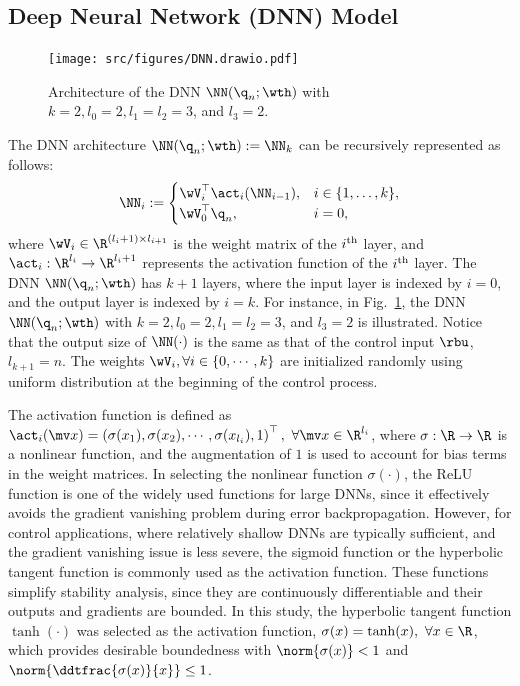 \documentclass[journal]{IEEEtran}
\begin{document}
\subsection{Deep Neural Network (DNN) Model}\label{sec:sub:NN definition}

\begin{figure}[t]
    \centering
    \texttt{[image: src/figures/DNN.drawio.pdf]}
    \caption{
        Architecture of the DNN $\NN({\q}_n;\wth)$ with $k=2,l_0=2,l_1=l_2=3$, and $l_3=2$.
    }
    \label{fig:DNN}
\end{figure}

The DNN architecture $\NN({\q}_n;\wth) := \NN_k$ can be recursively represented as follows:
\begin{equation}
    \NN_i :=
    \begin{cases}
        \wV_i^\top \act_i(\NN_{i-1}), 
        &
        i\in\{1,\dots ,k\},
        \\
        \wV_0^\top {\q}_n,
        &
        i=0
        ,
    \end{cases}
    \label{eq:DNN:architecture}
\end{equation}
where $\wV_i\in\R^{(l_i+1)\times l_{i+1}}$ is the weight matrix of the $i\textsuperscript{th}$ layer, and $\act_i: \R^{l_i}\to\R^{l_i+1}$ represents the activation function of the $i\textsuperscript{th}$ layer. 
The DNN $\NN({\q}_n;\wth)$ has $k+1$ layers, where the input layer is indexed by $i=0$, and the output layer is indexed by $i=k$.
For instance, in Fig.~\ref{fig:DNN}, the DNN $\NN({\q}_n;\wth)$ with $k=2,l_0=2,l_1=l_2=3$, and $l_3=2$ is illustrated.
Notice that the output size of $\NN(\cdot)$ is the same as that of the control input $\rbu$, \ie $l_{k+1}=n$. 
The weights $\wV_i,\forall i\in\{0,\cdots,k\}$ are initialized randomly using uniform distribution at the beginning of the control process.

The activation function is defined as $\act_i(\mv x)=\left(\sigma(x_1),\sigma(x_2),\cdots, \sigma(x_{l_{i}}), 1\right)^\top,\ \forall\mv x\in\R^{l_i}$, where $\sigma: \R\to\R$ is a nonlinear function, and the augmentation of $1$ is used to account for bias terms in the weight matrices. 
In selecting the nonlinear function $\sigma(\cdot)$, the ReLU function \cite{Maas:2013aa} is one of the widely used functions for large DNNs, since it effectively avoids the gradient vanishing problem during error backpropagation. 
However, for control applications, where relatively shallow DNNs are typically sufficient, and the gradient vanishing issue is less severe, the sigmoid function or the hyperbolic tangent function is commonly used as the activation function. 
These functions simplify stability analysis, since they are continuously differentiable and their outputs and gradients are bounded. 
In this study, the hyperbolic tangent function $\tanh(\cdot)$ was selected as the activation function, \ie $\sigma(x) = \tanh(x),\ \forall x\in\R$, which provides desirable boundedness with $\norm{\sigma(x)}<1$ and $\norm{\ddtfrac{\sigma(x)}{x}}\le 1$.
\end{document}
